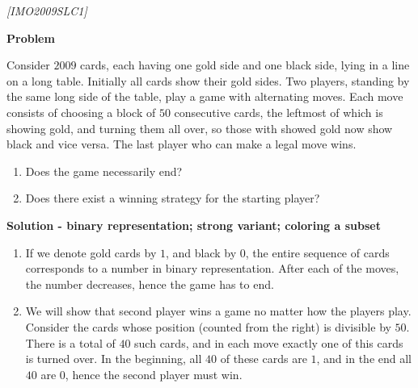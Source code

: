 
%
%

\renewcommand{\theenumi}{\alph{enumi}}




\noindent
 
\filbreak

\begin{problem}
\textit{[IMO2009SLC1]}


\textbf{Problem}

Consider $2009$ cards, each having one gold side and one black side, lying in a line on a long table. Initially all cards show their gold sides. Two players, standing by the same long side of the table, play a game with alternating moves. Each move consists of choosing a block of $50$ consecutive cards, the leftmost of which is showing gold, and turning them all over, so those with showed gold now show black and vice versa. The last player who can make a legal move wins.
\begin{enumerate}
\item Does the game necessarily end?
\item Does there exist a winning strategy for the starting player?
\end{enumerate}


\textbf{Solution - binary representation; strong variant; coloring a subset}
\begin{enumerate}
\item If we denote gold cards by $1$, and black by $0$, the entire sequence of cards  corresponds to a number in binary representation. After each of the moves, the number decreases, hence the game has to end.
\item We will show that second player wins a game no matter how the players play. Consider the cards whose position (counted from the right) is divisible by $50$. There is a total of $40$ such cards, and in each move exactly one of this cards is turned over. In the beginning, all $40$ of these cards are $1$, and in the end all $40$ are $0$, hence the second player must win.
\end{enumerate}
\end{problem}
%

